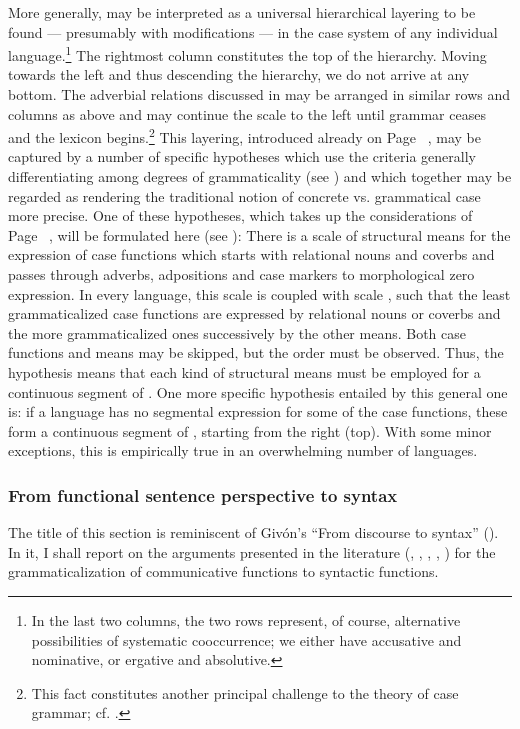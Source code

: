 \noindent\label{page120}More generally,  may be interpreted as a universal hierarchical layering to be found — presumably with modifications — in the case system of any individual language.\footnote{In the last two columns, the two rows represent, of course, alternative possibilities of systematic cooccurrence; we either have accusative and nominative, or ergative and absolutive.} The rightmost column constitutes the top of the hierarchy. Moving towards the left and thus descending the hierarchy, we do not arrive at any bottom. The adverbial relations discussed in  may be arranged in similar rows and columns as above and may continue the scale to the left until grammar ceases and the lexicon begins.\footnote{This fact constitutes another principal challenge to the theory of case grammar; cf. \citet[76f]{Dillon1977}.} This layering, introduced already on Page~\pageref{page102}\chk%
, may be captured by a number of specific hypotheses which use the criteria generally differentiating among degrees of grammaticality (see ) and which together may be regarded as rendering the traditional notion of concrete vs. grammatical case more precise. One of these hypotheses, which takes up the considerations of Page~\pageref{page102}\chk%
 , will be formulated here (see \citealt[§~4]{Lehmann1983}): There is a scale of structural means for the expression of case functions which starts with relational nouns and coverbs and passes through adverbs, adpositions and case markers to morphological zero expression. In every language, this scale is coupled with scale , such that the least grammaticalized case functions are expressed by relational nouns or coverbs and the more grammaticalized ones successively by the other means. Both case functions and means may be skipped, but the order must be observed. Thus, the hypothesis means that each kind of structural means must be employed for a continuous segment of . One more specific hypothesis entailed by this general one is: if a language has no segmental expression for some of the case functions, these form a continuous segment of , starting from the right (top). With some minor exceptions, this is empirically true in an overwhelming number of languages.

 
\subsubsection{From functional sentence perspective to syntax} \label{sec:3.4.2.3}
The title of this section is reminiscent of Givón's “From discourse to syntax” (\citeyear{Givón1979}). In it, I shall report on the arguments presented in the literature (\citealt{LiEtAl1976}, \citealt{Sankoff1977}, \citealt{Hagège1978}, \citealt{Givón1979}, \citealt{Vincent1980a}) for the grammaticalization of communicative functions to syntactic functions.

